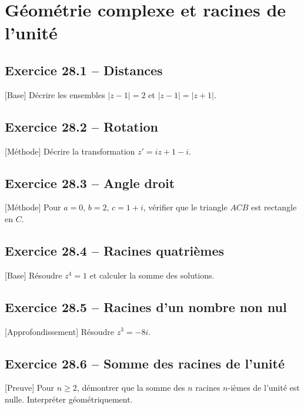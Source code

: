 \chapter{Géométrie complexe et racines de l’unité}
\section*{Exercice 28.1 -- Distances}
[Base] Décrire les ensembles $|z-1|=2$ et $|z-1|=|z+1|$.

\section*{Exercice 28.2 -- Rotation}
[Méthode] Décrire la transformation $z'=i z+1-i$.

\section*{Exercice 28.3 -- Angle droit}
[Méthode] Pour $a=0$, $b=2$, $c=1+i$, vérifier que le triangle $ACB$ est rectangle en $C$.

\section*{Exercice 28.4 -- Racines quatrièmes}
[Base] Résoudre $z^4=1$ et calculer la somme des solutions.

\section*{Exercice 28.5 -- Racines d’un nombre non nul}
[Approfondissement] Résoudre $z^3=-8i$.

\section*{Exercice 28.6 -- Somme des racines de l’unité}
[Preuve] Pour $n\ge2$, démontrer que la somme des $n$ racines $n$-ièmes de l'unité est nulle. Interpréter géométriquement.
